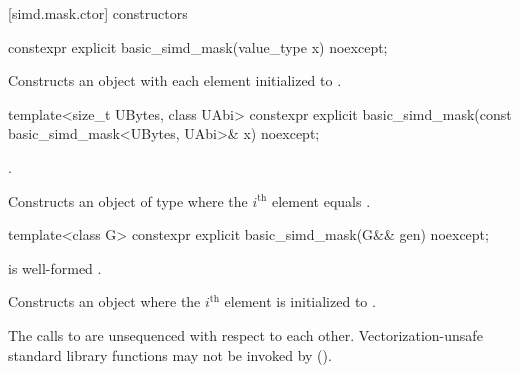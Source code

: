 [simd.mask.ctor]{ constructors}

\begin{itemdecl}
constexpr explicit basic_simd_mask(value_type x) noexcept;
\end{itemdecl}

\begin{itemdescr}
  \pnum\effects
  Constructs an object with each element initialized to .
\end{itemdescr}

\begin{itemdecl}
template<size_t UBytes, class UAbi>
  constexpr explicit basic_simd_mask(const basic_simd_mask<UBytes, UAbi>& x) noexcept;
\end{itemdecl}

\begin{itemdescr}
  \pnum\constraints
  .

  \pnum\effects
  Constructs an object of type  where the $i^\text{th}$ element equals  \foralli.
\end{itemdescr}

\begin{itemdecl}
template<class G> constexpr explicit basic_simd_mask(G&& gen) noexcept;
\end{itemdecl}

\begin{itemdescr}
  \pnum\constraints
   is
  well-formed \foralli.

  \pnum\effects
  Constructs an object where the $i^\text{th}$ element is initialized to
  .

  \pnum
  The calls to  are unsequenced with respect to each other.
  Vectorization-unsafe standard library functions may not be invoked by  ().
\end{itemdescr}

\newcommand\MaskLoadDescr[2]{
  \pnum\constraints
  \begin{itemize}
    \item \tcode{iter_value_t<It>} is of type \tcode{bool}, and
    \item \tcode{It} satisfies \tcode{contiguous_iterator}.
  \end{itemize}

  \pnum\expects
  \begin{itemize}
    \item #1
    \item \tcode{It} models \tcode{contiguous_iterator}.
    \flagsRequires{basic_simd_mask}{value_type}
  \end{itemize}

  \pnum\effects #2

  \pnum\throws Nothing.
}

